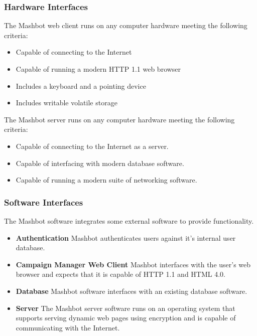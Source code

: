 \documentclass{report}
\begin{document}
		\subsubsection{Hardware Interfaces} %
                The Mashbot web client runs on any computer hardware meeting
                the following criteria:
                \begin{itemize}
                  \item Capable of connecting to the Internet
                  \item Capable of running a modern HTTP 1.1 web browser
                  \item Includes a keyboard and a pointing device
                  \item Includes writable volatile storage
                \end{itemize}
                The Mashbot server runs on any computer hardware meeting
                the following criteria:
                \begin{itemize}
                \item Capable of connecting to the Internet as a server.
                \item Capable of interfacing with modern database software.
                \item Capable of running a modern suite of networking software.
				\end{itemize}

		\subsubsection{Software Interfaces} %
                The Mashbot software integrates some external software
                to provide functionality.
                \begin{itemize}
                \item \textbf{Authentication} Mashbot authenticates users
                  against it's internal user database.
                \item \textbf{Campaign Manager Web Client} Mashbot
                  interfaces with the user’s web browser and expects
                  that it is capable of HTTP 1.1 and HTML 4.0.
                \item \textbf{Database} Mashbot software interfaces
                  with an existing database software.
                \item \textbf{Server} The Mashbot server software runs
                  on an operating system that supports serving dynamic
                  web pages using encryption and is capable of
                  communicating with the Internet.
                \end{itemize}
\end{document}
